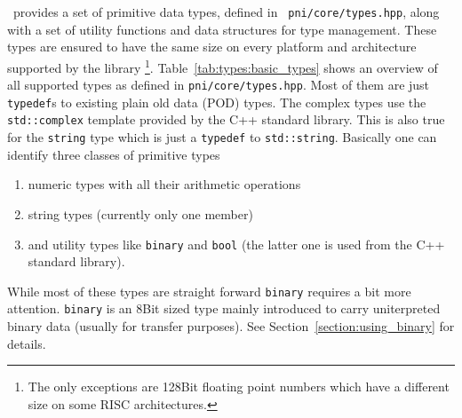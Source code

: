 \libpnicore\ provides a set of primitive data types, defined in {\tt
pni/core/types.hpp}, along with a set of utility functions
and data structures for type management. These types are ensured to
have the same size on every platform and architecture supported by the library
\footnote{The only exceptions are 128Bit floating point numbers which have a
    different size on some RISC architectures.}.
Table~\ref{tab:types:basic_types} shows an overview of all supported types as
defined in  {\tt pni/core/types.hpp}. Most of them are just {\tt typedef}s to
existing plain old data (POD) types. The complex types use the {\tt
std::complex} template provided by the C++ standard library. This is also true
for the {\tt string} type which is just a {\tt typedef} to {\tt std::string}. 
Basically one can identify three classes of primitive types
\begin{enumerate}
\item numeric types with all their arithmetic operations
\item string types (currently only one member)
\item and utility types like {\tt binary} and {\tt bool} (the latter one is used
from the C++ standard library).
\end{enumerate}

While most of these types are straight forward {\tt binary} requires a bit more
attention. {\tt binary} is an 8Bit sized type mainly introduced to carry 
uniterpreted binary data (usually for transfer purposes).  See
Section~\ref{section:using_binary} for details.

